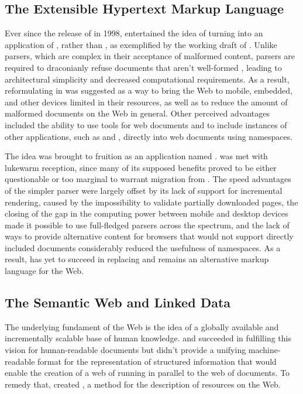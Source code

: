 \documentclass[
  a5paper,10pt,           %
  dvipsnames              %
]{book}
\begin{document}
\subsection{The Extensible Hypertext Markup Language}
Ever since the release of  in 1998,  entertained the
idea of turning  into an application of , rather than
, as exemplified by the working draft of .
Unlike  parsers, which are complex in their acceptance of
malformed content,  parsers are required to draconianly refuse
 documents that aren't well-formed \cite[Section~1.2,
Terminology]{bray98}, leading to architectural simplicity and decreased
computational requirements. As a result, reformulating  in
 was suggested as a way to bring the Web to mobile, embedded, and
other devices limited in their resources, as well as to reduce the amount of
malformed documents on the Web in general. Other perceived advantages included
the ability to use  tools for web documents and to include
instances of other  applications, such as  and
, directly into web documents using  namespaces.

The idea was brought to fruition as an  application named
.  was met with lukewarm reception, since many of
its supposed benefits proved to be either questionable or too marginal to
warrant migration from . The speed advantages of the simpler
parser were largely offset by its lack of support for incremental rendering,
caused by the impossibility to validate partially downloaded pages, the closing
of the gap in the computing power between mobile and desktop devices made it
possible to use full-fledged  parsers across the spectrum, and the
lack of ways to provide alternative content for browsers that would not support
directly included  documents considerably reduced the usefulness
of  namespaces. As a result,  has yet to succeed in
replacing  and remains an alternative markup language for the Web.


\subsection{The Semantic Web and Linked Data}
The underlying fundament of the Web is the idea of a globally available and
incrementally scalable base of human knowledge.  and
 succeeded in fulfilling this vision for human-readable documents
but didn't provide a unifying machine-readable format for the representation of
structured information that would enable the creation of a web of 
running in parallel to the web of documents. To remedy that, 
created , a method for the description of resources on the Web.
\end{document}
